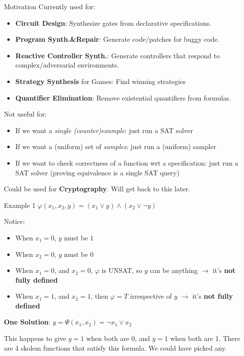 \documentclass[aspectratio=169]{beamer}
\begin{document}
\begin{frame}{Motivation}
Currently used for:
\begin{itemize}
    \item \textbf{Circuit Design}: Synthesize gates from declarative specifications.
    \item \textbf{Program Synth.\&Repair}: Generate code/patches for buggy code.
    \item \textbf{Reactive Controller Synth.}: Generate controllers
        that respond to complex/adversarial environments.
    \item \textbf{Strategy Synthesis} for Games: Find winning strategies
    \item \textbf{Quantifier Elimination}: Remove existential quantifiers from
        formulas.
\end{itemize}
\bigskip

Not useful for:
\begin{itemize}
    \item If we want a \emph{single (counter)example}: just run a SAT solver
    \item If we want a (uniform) set of \emph{samples}: just run a (uniform) sampler
    \item If we want to check correctness of a function wrt a specification:
        just run a SAT solver (proving equivalence is a single SAT query)
\end{itemize}
\bigskip

Could be used for \textbf{Cryptography}. Will get back to this later.
\end{frame}

\begin{frame}{Example 1}
$\varphi(x_1, x_2, y) = (x_1 \lor y) \land (x_2 \lor \neg y)$
\bigskip

Notice:
\begin{itemize}
    \item When $x_1 = 0$, $y$ must be $1$
    \item When $x_2 = 0$, $y$ must be $0$
    \item When $x_1 = 0$, and $x_2 = 0$, $\varphi$ is UNSAT, so $y$ can be anything $\rightarrow$ it's \textbf{not fully defined}
    \item When $x_1 = 1$, and $x_2 = 1$, then $\varphi = T$ irrespective of $y$ $\rightarrow$ it's \textbf{not fully defined}
\end{itemize}
\bigskip

\textbf{One Solution}: $y = \Psi(x_1, x_2) = \neg x_1 \lor x_2$
\bigskip

This happens to give $y=1$ when both are 0, and $y=1$ when both are 1. There
are 4 skolem functions that satisfy this formula. We could have picked
any.
\end{frame}
\end{document}
